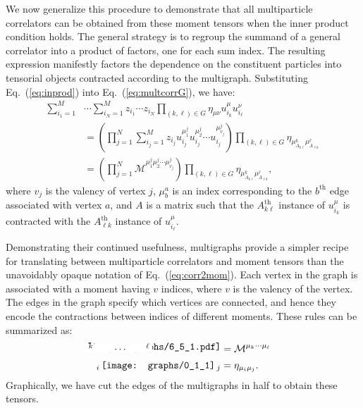 \documentclass[aps,prd,floatfix,preprintnumbers,twocolumn,groupedaddress,nofootinbib,longbibliography,10pt]{revtex4-1}
\DeclareRobustCommand{\Eq}[1]{Eq.~(\ref{#1})}
\begin{document}
We now generalize this procedure to demonstrate that all multiparticle correlators can be obtained from these moment tensors when the inner product condition holds.
%
The general strategy is to regroup the summand of a general correlator into a product of factors, one for each sum index.
%
The resulting expression manifestly factors the dependence on the constituent particles into tensorial objects contracted according to the multigraph.
%
Substituting \Eq{eq:inprod} into \Eq{eq:multcorrG}, we have:
\begin{align}
\sum_{i_1=1}^M&\cdots\sum_{i_N=1}^M z_{i_1}\cdots z_{i_N} \prod_{(k,\ell) \in G}\eta_{\mu\nu}  u_{i_k}^\mu u_{i_\ell}^\nu\nonumber\\
& = \left( \prod_{j=1}^N\sum_{i_j=1}^M z_{i_j}  u_{i_j}^{\mu_1^j} u_{i_j}^{\mu_2^j}\cdots u_{i_j}^{\mu_{v_j}^j}\right)\prod_{(k,\ell)\in G} \eta_{\mu^{k}_{A_{k\ell}} \mu^{\ell}_{A_{\ell k}}}\nonumber\\
&=\left( \prod_{j=1}^N {\mathcal M}^{\mu_1^j \mu_2^j\cdots \mu_{v_j}^j}\right)  \prod_{(k,\ell)\in G} \eta_{\mu^{k}_{A_{k\ell}} \mu^{\ell}_{A_{\ell k}}}, 
\label{eq:corr2mom}
\end{align}
where $v_j$ is the valency of vertex $j$, $\mu^a_b$ is an index corresponding to the $b^{\text{th}}$ edge associated with vertex $a$, and $A$ is a matrix such that the $A_{k\ell}^{\text{th}}$ instance of $u_{i_k}^\mu$ is contracted with the $A_{\ell k}^{\text{th}}$ instance of $u_{i_\ell}^\mu$.


Demonstrating their continued usefulness, multigraphs provide a simpler recipe for translating between multiparticle correlators and moment tensors than the unavoidably opaque notation of \Eq{eq:corr2mom}.
%
Each vertex in the graph is associated with a moment having $v$ indices, where $v$ is the valency of the vertex.
%
The edges in the graph specify which vertices are connected, and hence they encode the contractions between indices of different moments.
%
These rules can be summarized as:
\begin{align}
\begin{gathered}
\begin{tikzpicture}[      
        every node/.style={anchor=south west,inner sep=0pt},
        x=1mm, y=1mm,
      ]   
     \node (fig2) at (3,3)
       {\texttt{[image: graphs/6\_5\_1.pdf]}};  
     \draw [fill=patchcolor,patchcolor] (3,3) rectangle (26.5,5.75);
	\node[text width=0.05cm] at (3.75,3) {$^k$} ;
	\node[text width=0.05cm] at (13,3) {$\cdots$} ;
	\node[text width=0.05cm] at (24.25,3) {$^\ell$} ;
\end{tikzpicture}\end{gathered}  &= \mathcal M^{\mu_k \cdots \mu_\ell}\\
\label{eq:erule}\begin{gathered}_i\, \texttt{[image: graphs/0\_1\_1]}\,_j\end{gathered} &= \eta_{\mu_i \mu_j}.
\end{align}
%
Graphically, we have cut the edges of the multigraphs in half to obtain these tensors.
\end{document}
